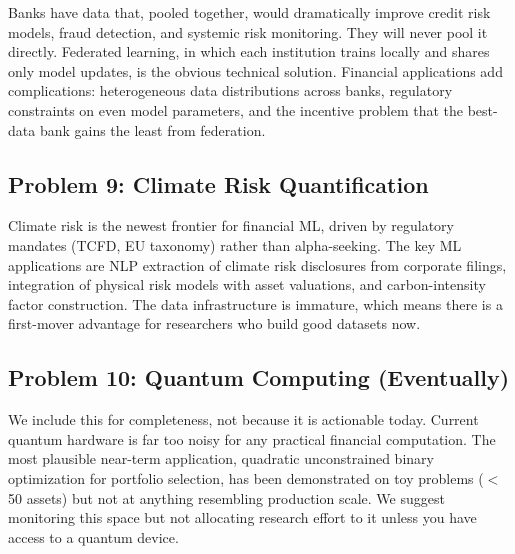 Banks have data that, pooled together, would dramatically improve credit risk models, fraud detection, and systemic risk monitoring. They will never pool it directly. Federated learning, in which each institution trains locally and shares only model updates, is the obvious technical solution. Financial applications add complications: heterogeneous data distributions across banks, regulatory constraints on even model parameters, and the incentive problem that the best-data bank gains the least from federation.

\subsection{Problem 9: Climate Risk Quantification}

Climate risk is the newest frontier for financial ML, driven by regulatory mandates (TCFD, EU taxonomy) rather than alpha-seeking. The key ML applications are NLP extraction of climate risk disclosures from corporate filings, integration of physical risk models with asset valuations, and carbon-intensity factor construction. The data infrastructure is immature, which means there is a first-mover advantage for researchers who build good datasets now.

\subsection{Problem 10: Quantum Computing (Eventually)}

We include this for completeness, not because it is actionable today. Current quantum hardware is far too noisy for any practical financial computation. The most plausible near-term application, quadratic unconstrained binary optimization for portfolio selection, has been demonstrated on toy problems ($<$50 assets) but not at anything resembling production scale. We suggest monitoring this space but not allocating research effort to it unless you have access to a quantum device.
